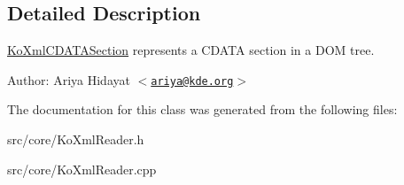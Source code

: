 \subsection{Detailed Description}
\hyperlink{classKoXmlCDATASection}{KoXmlCDATASection} represents a CDATA section in a DOM tree. \begin{Desc}
\item[Author:]Ariya Hidayat $<$\href{mailto:ariya@kde.org}{\tt ariya@kde.org}$>$ \end{Desc}


The documentation for this class was generated from the following files:\begin{CompactItemize}
\item 
src/core/KoXmlReader.h\item 
src/core/KoXmlReader.cpp\end{CompactItemize}
